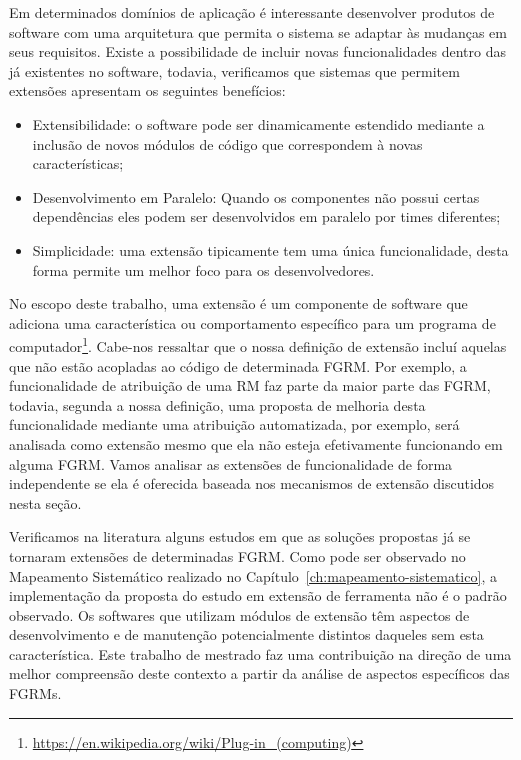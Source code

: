 Em determinados domínios de aplicação é interessante desenvolver produtos de
software com uma arquitetura que permita o sistema se adaptar às mudanças em
seus requisitos. Existe a possibilidade de incluir novas funcionalidades dentro
das já existentes no software, todavia, verificamos que sistemas que permitem
extensões apresentam os seguintes benefícios:

\begin{itemize}
    \item Extensibilidade: o software pode ser dinamicamente estendido mediante
        a inclusão de novos módulos de código que correspondem à novas
        características;
    \item Desenvolvimento em Paralelo: Quando os componentes não possui certas
        dependências eles podem ser desenvolvidos em paralelo por times
        diferentes;
    \item Simplicidade: uma extensão tipicamente tem uma única funcionalidade,
        desta forma permite um melhor foco para os desenvolvedores.
\end{itemize}

No escopo deste trabalho, uma extensão é um componente de software que adiciona
uma característica ou comportamento específico para um programa de
computador\footnote{\url{https://en.wikipedia.org/wiki/Plug-in\_(computing)}}.
Cabe-nos ressaltar que o nossa definição de extensão incluí aquelas que não
estão acopladas ao código de determinada FGRM\@. Por exemplo, a funcionalidade
de atribuição de uma RM faz parte da maior parte das FGRM, todavia, segunda a
nossa definição, uma proposta de melhoria desta funcionalidade mediante uma
atribuição automatizada, por exemplo, será analisada como extensão mesmo que ela
não esteja efetivamente funcionando em alguma FGRM\@. Vamos a\-na\-li\-sar as
extensões de funcionalidade de forma independente se ela é oferecida baseada nos
mecanismos de extensão discutidos nesta seção.

Verificamos na literatura alguns estudos em que as soluções propostas já se
tornaram extensões de determinadas FGRM\@. Como pode ser observado no Mapeamento
Sistemático realizado no Capítulo~\ref{ch:mapeamento-sistematico}, a
implementação da proposta do estudo em extensão de ferramenta não é o padrão
observado. Os softwares que utilizam módulos de extensão têm aspectos de
desenvolvimento e de manutenção potencialmente distintos daqueles sem esta
característica. Este trabalho de mestrado faz uma contribuição na direção de uma
melhor compreensão deste contexto a partir da análise de aspectos específicos
das FGRMs.

